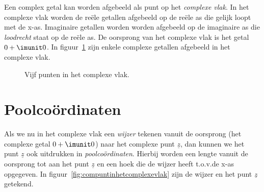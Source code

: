 %
%
%

Een complex getal kan worden afgebeeld als punt op het \textsl{complexe vlak}. In het complexe vlak worden de reële getallen afgebeeld op de reële as die gelijk loopt met de x-as. Imaginaire getallen worden worden afgebeeld op de imaginaire as die \textsl{loodrecht} staat op de reële as. De oorsprong van het complexe vlak is het getal $0+\imunit0$. In figuur~\ref{fig:comvierpunten} zijn enkele complexe getallen afgebeeld in het complexe vlak.

\begin{figure}[H]
\centering
{}
\caption{Vijf punten in het complexe vlak.}
\label{fig:comvierpunten}
\end{figure}


\section{Poolcoördinaten}

Als we nu in het complexe vlak een \textsl{wijzer} tekenen vanuit de oorsprong (het complexe getal $0+\imunit0$) naar het complexe punt $\underline{z}$, dan kunnen we het punt $\underline{z}$ ook uitdrukken in \textsl{poolcoördinaten}. Hierbij worden een lengte vanuit de oorsprong tot aan het punt $\underline{z}$ en een hoek die de wijzer heeft t.o.v.\@ de x-as opgegeven. In figuur~\ref{fig:compuntinhetcomplexevlak} zijn de wijzer en het punt $\underline{z}$ getekend.

